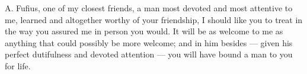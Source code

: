 

 A. Fufius, one of my closest friends, a man most devoted and most attentive to me, learned and altogether worthy of your friendship, I should like you to treat in the way you assured me in person you would. It will be as welcome to me as anything that could possibly be more welcome; and in him besides --- given his perfect dutifulness and devoted attention --- you will have bound a man to you for life.
